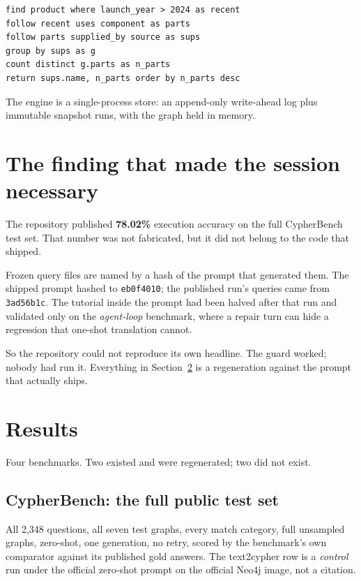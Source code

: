 \documentclass[11pt]{article}
\begin{document}
\begin{lstlisting}[style=gl]
find product where launch_year > 2024 as recent
follow recent uses component as parts
follow parts supplied_by source as sups
group by sups as g
count distinct g.parts as n_parts
return sups.name, n_parts order by n_parts desc
\end{lstlisting}

\noindent The engine is a single-process store: an append-only write-ahead log
plus immutable snapshot runs, with the graph held in memory.

\section{The finding that made the session necessary}

The repository published \textbf{78.02\%} execution accuracy on the full
CypherBench test set. That number was not fabricated, but it did not belong to
the code that shipped.

Frozen query files are named by a hash of the prompt that generated them. The
shipped prompt hashed to \texttt{eb0f4010}; the published run's queries came from
\texttt{3ad56b1c}. The tutorial inside the prompt had been halved after that run
and validated only on the \emph{agent-loop} benchmark, where a repair turn can
hide a regression that one-shot translation cannot.

So the repository could not reproduce its own headline. The guard worked; nobody
had run it. Everything in Section~\ref{sec:results} is a regeneration against the
prompt that actually ships.

\section{Results}
\label{sec:results}

Four benchmarks. Two existed and were regenerated; two did not exist.

\subsection{CypherBench: the full public test set}

All 2{,}348 questions, all seven test graphs, every match category, full
unsampled graphs, zero-shot, one generation, no retry, scored by the benchmark's
own comparator against its published gold answers. The text2cypher row is a
\emph{control} run under the official zero-shot prompt on the official Neo4j
image, not a citation.
\end{document}
